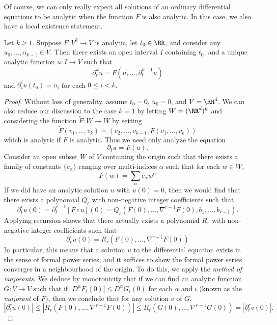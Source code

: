 Of course, we can only really expect all solutions of an ordinary differential equations to be analytic when the function $F$ is also analytic. In this case, we also have a local existence statement.

\begin{lemma}
    Let $k \geq 1$. Suppose $F: V^k \to V$ is analytic, let $t_0 \in \RR$, and consider any $u_0,\dots,u_{k-1} \in V$. Then there exists an open interval $I$ containing $t_0$, and a unique analytic function $u: I \to V$ such that
    \[ \partial_t^k u = F(u,\dots,\partial_t^{k-1} u) \]
    and $\partial_t^i u(t_0) = u_i$ for each $0 \leq i < k$.
\end{lemma}
\begin{proof}
    Without loss of generality, assume $t_0 = 0$, $u_0 = 0$, and $V = \RR^d$. We can also reduce our discussion to the case $k = 1$ by letting $W = (\RR^d)^k$ and considering the function $\tilde{F}: W \to W$ by setting
    \[ \tilde{F}(v_1,\dots,v_k) = (v_2,\dots,v_{k-1},F(v_1,\dots,v_k)) \]
    which is analytic if $F$ is analytic. Thus we need only analyze the equation
    \[ \partial_t u = F(u). \]
    Consider an open subset $W$ of $V$ containing the origin such that there exists a family of constants $\{ c_\alpha \}$ ranging over multi-indices $\alpha$ such that for each $w \in W$,
    \[ F(w) = \sum_\alpha c_\alpha w^\alpha \]
    If we did have an analytic solution $u$ with $u(0) = 0$, then we would find that there exists a polynomial $Q_r$ with non-negative integer coefficients such that
    \[ \partial_t^r u(0) = \partial_t^{r-1} [F \circ u](0) = Q_r(F(0),\dots,\nabla^{r-1} F(0),b_1,\dots,b_{r-1}). \]
    Applying recursion shows that there actually exists a polynomial $R_r$ with non-negative integer coefficients such that
    \[ \partial_t^r u(0) = R_r(F(0),\dots,\nabla^{r-1} F(0)) \]
    In particular, this means that a solution $u$ to the differential equation exists in the sense of formal power series, and it suffices to show the formal power series converges in a neighbourhood of the origin. To do this, we apply the \emph{method of majorants}. We deduce by monotonicity that if we can find an analytic function $G: V \to V$ such that if $|D^\alpha F_i(0)| \leq D^\alpha G_i(0)$ for each $\alpha$ and $i$ (known as the \emph{majorant} of $F$), then we conclude that for any solution $v$ of $G$,
    \[ |\partial_t^r u(0)| \leq |R_r(F(0),\dots,\nabla^{r-1} F(0))| \leq R_r(G(0),\dots,\nabla^{r-1}G(0)) = |\partial_t^r v(0)|. \]

\end{proof}
